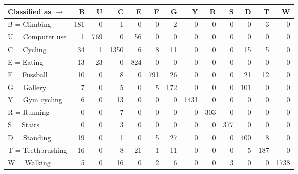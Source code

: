 \begin{tabular}{lrrrrrrrrrrrr}
\toprule
Classified as $\rightarrow$ &    B &    U &     C &    E &    F &    G &     Y &    R &    S &    D &    T &     W \\
\midrule
B = Climbing      &  181 &    0 &     1 &    0 &    0 &    2 &     0 &    0 &    0 &    0 &    3 &     0 \\
U = Computer use  &    1 &  769 &     0 &   56 &    0 &    0 &     0 &    0 &    0 &    0 &    0 &     0 \\
C = Cycling       &   34 &    1 &  1350 &    6 &    8 &   11 &     0 &    0 &    0 &   15 &    5 &     0 \\
E = Eating        &   13 &   23 &     0 &  824 &    0 &    0 &     0 &    0 &    0 &    0 &    0 &     0 \\
F = Fussball      &   10 &    0 &     8 &    0 &  791 &   26 &     0 &    0 &    0 &   21 &   12 &     0 \\
G = Gallery       &    7 &    0 &     5 &    0 &    5 &  172 &     0 &    0 &    0 &  101 &    0 &     0 \\
Y = Gym cycling   &    6 &    0 &    13 &    0 &    0 &    0 &  1431 &    0 &    0 &    0 &    0 &     0 \\
R = Running       &    0 &    0 &     7 &    0 &    0 &    0 &     0 &  303 &    0 &    0 &    0 &     0 \\
S = Stairs        &    0 &    0 &     3 &    0 &    0 &    0 &     0 &    0 &  377 &    0 &    0 &     0 \\
D = Standing      &   19 &    0 &     1 &    0 &    5 &   27 &     0 &    0 &    0 &  400 &    8 &     0 \\
T = Teethbrushing &   16 &    0 &     8 &   21 &    1 &   11 &     0 &    0 &    0 &    5 &  187 &     0 \\
W = Walking       &    5 &    0 &    16 &    0 &    2 &    6 &     0 &    0 &    3 &    0 &    0 &  1738 \\
\bottomrule
\end{tabular}
